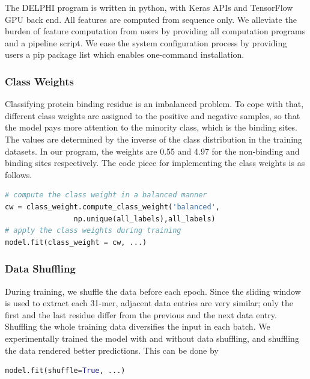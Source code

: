 The DELPHI program is written in python, with Keras \cite{chollet2015keras} APIs and TensorFlow GPU back end. All features are computed from sequence only. We alleviate the burden of feature computation from users by providing all computation programs and a pipeline script. We ease the system configuration process by providing users a pip package list which enables one-command installation. 

\subsubsection{Class Weights}
Classifying protein binding residue is an imbalanced problem. To cope with that, different class weights \cite{ting2002instance} are assigned to the positive and negative samples, so that the model pays more attention to the minority class, which is the binding sites.  The values are determined by the inverse of the class distribution in the training datasets. In our program, the weights are 0.55 and 4.97 for the non-binding and binding sites respectively. The code piece for implementing the class weights is as follows.
\begin{lstlisting}[language=python,frame=single,basicstyle=\small]
# compute the class weight in a balanced manner
cw = class_weight.compute_class_weight('balanced',
                np.unique(all_labels),all_labels)
# apply the class weights during training
model.fit(class_weight = cw, ...)
\end{lstlisting}

\subsubsection{Data Shuffling}
During training, we shuffle the data before each epoch. Since the sliding window is used to extract each 31-mer, adjacent data entries are very similar; only the first and the last residue differ from the previous and the next data entry. Shuffling the whole training data diversifies the input in each batch. We experimentally trained the model with and without data shuffling, and shuffling the data rendered better predictions. This can be done by 
\begin{lstlisting}[language=python,frame=single]
  model.fit(shuffle=True, ...)
\end{lstlisting}

